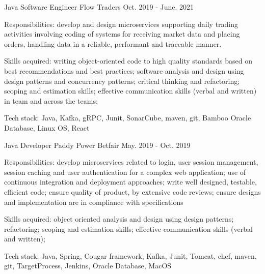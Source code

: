 \begin{cventries}
  \cventry
    {Java Software Engineer} %
    {Flow Traders} %
    {} %
    {Oct. 2019 - June. 2021} %
    {
      \begin{cvitems} %
        \item {Responsibilities: develop and design microservices supporting daily trading activities involving coding of systems for receiving market data and placing orders, handling data in a reliable, performant and traceable manner. }
        \item {Skills acquired: writing object-oriented code to high quality standards based on best recommendations and best practices; software analysis and design using design patterns and concurrency patterns; critical thinking and refactoring; scoping and estimation skills; effective communication skills (verbal and written) in team and across the teams;}
        \item {Tech stack: Java, Kafka, gRPC, Junit, SonarCube, maven, git, Bamboo Oracle Database, Linux OS, React}
      \end{cvitems}
    }

  \cventry
    {Java Developer} %
    {Paddy Power Betfair} %
    {} %
    {May. 2019 - Oct. 2019} %
    {
      \begin{cvitems} %
        \item {Responsibilities: develop microservices related to login, user session management, session caching and user authentication for a complex web application; use of continuous integration and deployment approaches; write well designed, testable, efficient code; ensure quality of product, by extensive code reviews; ensure designs and implementation are in compliance with specifications}
        \item {Skills acquired: object oriented analysis and design using design patterns; refactoring; scoping and estimation skills; effective communication skills (verbal and written);}
        \item {Tech stack: Java, Spring, Cougar framework, Kafka, Junit, Tomcat, chef, maven, git, TargetProcess, Jenkins, Oracle Database, MacOS}
      \end{cvitems}
    }


\end{cventries}
